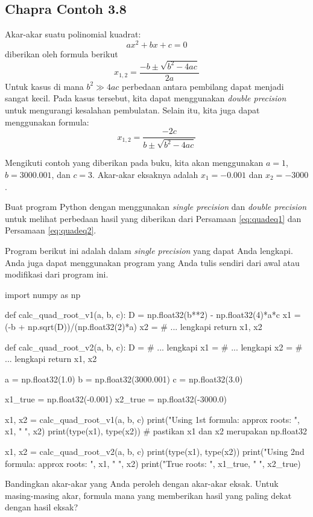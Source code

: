 \subsection{Chapra Contoh 3.8}
Akar-akar suatu polinomial kuadrat:
\begin{equation*}
ax^2 + bx + c = 0
\end{equation*}
diberikan oleh formula berikut
\begin{equation}
x_{1,2} = \frac{-b \pm \sqrt{b^2 - 4ac}}{2a}
\label{eq:quadeq1}
\end{equation}
Untuk kasus di mana $b^2 \gg 4ac$ perbedaan antara pembilang dapat menjadi sangat kecil.
Pada kasus tersebut, kita dapat menggunakan \textit{double precision} untuk mengurangi
kesalahan pembulatan. Selain itu, kita juga dapat menggunakan formula:
\begin{equation}
x_{1,2} = \frac{-2c}{b \pm \sqrt{b^2 - 4ac}}
\label{eq:quadeq2}
\end{equation}

Mengikuti contoh yang diberikan pada buku, kita akan menggunakan
$a = 1$, $b = 3000.001$, dan $c = 3$. Akar-akar eksaknya adalah
$x_{1} = -0.001$ dan $x_2 = -3000$.

\begin{soal}
Buat program Python dengan menggunakan \textit{single precision} dan
\textit{double precision} untuk melihat perbedaan hasil yang diberikan 
dari Persamaan \eqref{eq:quadeq1} dan Persamaan \eqref{eq:quadeq2}.

Program berikut ini adalah dalam \textit{single precision}
yang dapat Anda lengkapi. Anda juga dapat menggunakan program yang Anda tulis sendiri
dari awal atau modifikasi dari program ini.
\begin{pythoncode}
import numpy as np

def calc_quad_root_v1(a, b, c):
    D = np.float32(b**2) - np.float32(4)*a*c
    x1 = (-b + np.sqrt(D))/(np.float32(2)*a)
    x2 = # ... lengkapi
    return x1, x2
  
def calc_quad_root_v2(a, b, c):
    D = # ... lengkapi
    x1 = # ... lengkapi
    x2 = # ... lengkapi
    return x1, x2
  
a = np.float32(1.0)
b = np.float32(3000.001)
c = np.float32(3.0)
  
x1_true = np.float32(-0.001)
x2_true = np.float32(-3000.0)
  
x1, x2 = calc_quad_root_v1(a, b, c)
print("Using 1st formula: approx roots: ", x1, " ", x2)
print(type(x1), type(x2)) # pastikan x1 dan x2 merupakan np.float32
  
x1, x2 = calc_quad_root_v2(a, b, c)
print(type(x1), type(x2))
print("Using 2nd formula: approx roots: ", x1, " ", x2)  
print("True roots: ", x1_true, " ", x2_true)
\end{pythoncode}

Bandingkan akar-akar yang Anda peroleh dengan akar-akar eksak.
Untuk masing-masing akar, formula mana yang memberikan hasil yang paling dekat dengan
hasil eksak?
\end{soal}

